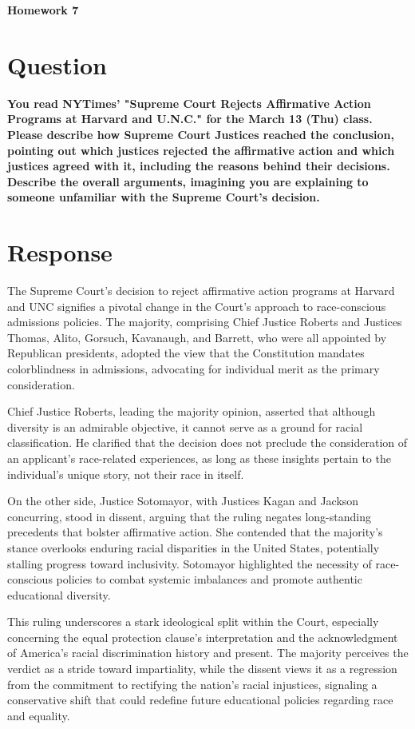 \documentclass[12pt]{article}
\begin{document}
\begin{center}
  \Large \textbf{Homework 7}
\end{center}

\section*{Question}
\textbf{You read NYTimes' "Supreme Court Rejects Affirmative Action Programs at Harvard and U.N.C." for the March 13 (Thu) class. Please describe how Supreme Court Justices reached the conclusion, pointing out which justices rejected the affirmative action and which justices agreed with it, including the reasons behind their decisions. Describe the overall arguments, imagining you are explaining to someone unfamiliar with the Supreme Court's decision.}

\section*{Response}
The Supreme Court's decision to reject affirmative action programs at Harvard and UNC signifies a pivotal change in the Court's approach to race-conscious admissions policies. The majority, comprising Chief Justice Roberts and Justices Thomas, Alito, Gorsuch, Kavanaugh, and Barrett, who were all appointed by Republican presidents, adopted the view that the Constitution mandates colorblindness in admissions, advocating for individual merit as the primary consideration.

Chief Justice Roberts, leading the majority opinion, asserted that although diversity is an admirable objective, it cannot serve as a ground for racial classification. He clarified that the decision does not preclude the consideration of an applicant's race-related experiences, as long as these insights pertain to the individual's unique story, not their race in itself.

On the other side, Justice Sotomayor, with Justices Kagan and Jackson concurring, stood in dissent, arguing that the ruling negates long-standing precedents that bolster affirmative action. She contended that the majority's stance overlooks enduring racial disparities in the United States, potentially stalling progress toward inclusivity. Sotomayor highlighted the necessity of race-conscious policies to combat systemic imbalances and promote authentic educational diversity.

This ruling underscores a stark ideological split within the Court, especially concerning the equal protection clause's interpretation and the acknowledgment of America's racial discrimination history and present. The majority perceives the verdict as a stride toward impartiality, while the dissent views it as a regression from the commitment to rectifying the nation's racial injustices, signaling a conservative shift that could redefine future educational policies regarding race and equality.
\end{document}
